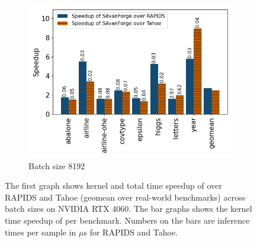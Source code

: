 \begin{figure}[htb]
\begin{subfigure}[t]{.32\linewidth}
      \includegraphics[width=\textwidth]{figures/speedup_bar_graph_8192.png}
      \caption{\label{Fig:KernelTimeIndividualBenchmarks4060b} Batch size 8192}
    \end{subfigure}
    \caption{The first graph shows kernel and total time speedup of \Treebeard{} over RAPIDS and Tahoe (geomean over real-world 
    benchmarks) across batch sizes on NVIDIA RTX 4060. The bar graphs shows the kernel time speedup of \Treebeard{} per benchmark. Numbers on the bars are inference times per sample in $\mu$s for RAPIDS and Tahoe.}
\end{figure}




